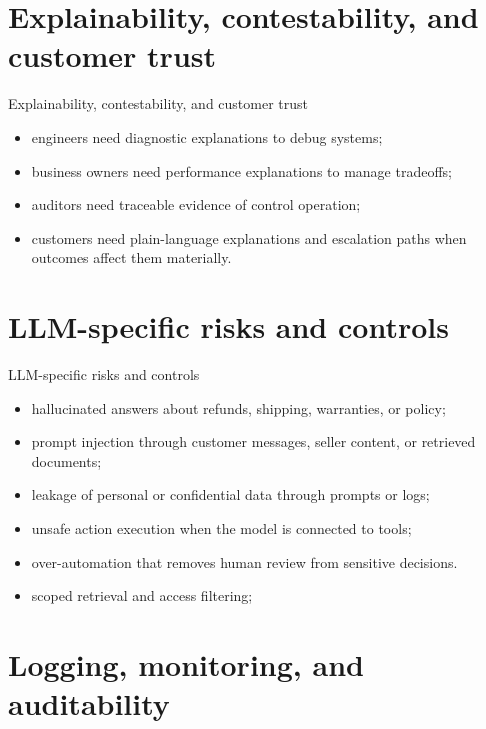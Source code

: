 \documentclass[aspectratio=169]{beamer}
\begin{document}
\section{Explainability, contestability, and customer trust}

\begin{frame}{Explainability, contestability, and customer trust}
  \begin{itemize}
    \item engineers need diagnostic explanations to debug systems;
    \item business owners need performance explanations to manage tradeoffs;
    \item auditors need traceable evidence of control operation;
    \item customers need plain-language explanations and escalation paths when outcomes affect them materially.
  \end{itemize}
\end{frame}

\section{LLM-specific risks and controls}

\begin{frame}{LLM-specific risks and controls}
  \begin{itemize}
    \item hallucinated answers about refunds, shipping, warranties, or policy;
    \item prompt injection through customer messages, seller content, or retrieved documents;
    \item leakage of personal or confidential data through prompts or logs;
    \item unsafe action execution when the model is connected to tools;
    \item over-automation that removes human review from sensitive decisions.
    \item scoped retrieval and access filtering;
  \end{itemize}
\end{frame}

\section{Logging, monitoring, and auditability}
\end{document}
